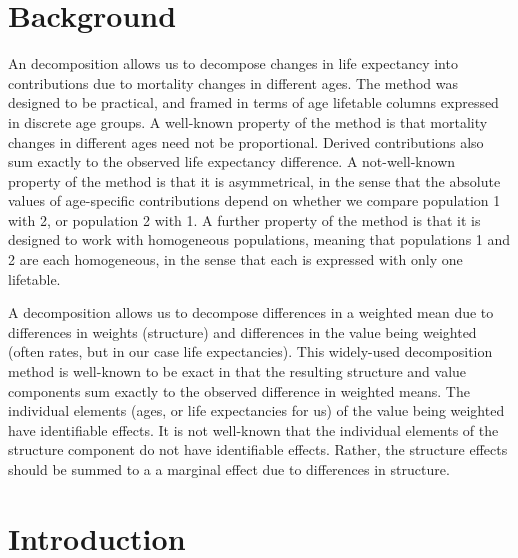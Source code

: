 \documentclass[sn-apa,pdflatex]{sn-jnl}
\theoremstyle{remark}
\theoremstyle{definition}
\begin{document}
\hypertarget{background}{%
\section{Background}\label{background}}

An \citet{arriaga1984measuring} decomposition allows us to decompose
changes in life expectancy into contributions due to mortality changes
in different ages. The method was designed to be practical, and framed
in terms of age lifetable columns expressed in discrete age groups. A
well-known property of the method is that mortality changes in different
ages need not be proportional. Derived contributions also sum exactly to
the observed life expectancy difference. A not-well-known property of
the method is that it is asymmetrical, in the sense that the absolute
values of age-specific contributions depend on whether we compare
population 1 with 2, or population 2 with 1. A further property of the
method is that it is designed to work with homogeneous populations,
meaning that populations 1 and 2 are each homogeneous, in the sense that
each is expressed with only one lifetable.

A \citet{kitagawa1955components} decomposition allows us to decompose
differences in a weighted mean due to differences in weights (structure)
and differences in the value being weighted (often rates, but in our
case life expectancies). This widely-used decomposition method is
well-known to be exact in that the resulting structure and value
components sum exactly to the observed difference in weighted means. The
individual elements (ages, or life expectancies for us) of the value
being weighted have identifiable effects. It is not well-known that the
individual elements of the structure component do not have identifiable
effects. Rather, the structure effects should be summed to a a marginal
effect due to differences in structure.

\hypertarget{introduction}{%
\section{Introduction}\label{introduction}}
\end{document}

